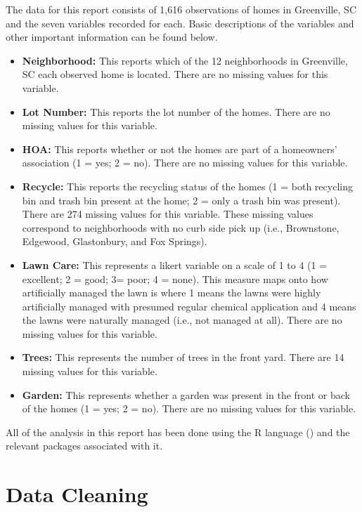 \documentclass{article}
\begin{document}
The data for this report consists of 1,616 observations of homes in Greenville, SC and the seven variables recorded for each. 
Basic descriptions of the variables and other important information can be found below.
\begin{itemize}
\item \textbf{Neighborhood:} This reports which of the 12 neighborhoods in Greenville, SC each observed home is located. There are no missing values for this variable. 
\item \textbf{Lot Number:} This reports the lot number of the homes. There are no missing values for this variable. 
\item \textbf{HOA:} This reports whether or not the homes are part of a homeowners' association (1 = yes; 2 = no). There are no missing values for this variable.
\item \textbf{Recycle:} This reports the recycling status of the homes (1 = both recycling bin and trash bin present at the home; 2 = only a trash bin was present). There are 274 missing values for this variable. These missing values correspond to neighborhoods with no curb side pick up (i.e., Brownstone, Edgewood, Glastonbury, and Fox Springs).
\item \textbf{Lawn Care:} This represents a likert variable on a scale of 1 to 4 (1 = excellent; 2 = good; 3= poor; 4 = none). This measure
maps onto how artificially managed the lawn is where 1 means the lawns were highly artificially managed with presumed regular chemical application and 4 means the lawns were naturally managed (i.e., not managed at all). There are no missing values for this variable.
\item \textbf{Trees:} This represents the number of trees in the front yard. There are 14 missing values for this variable. 
\item \textbf{Garden:} This represents whether a garden was present in the front or back of the homes (1 = yes; 2 = no). There are no missing values for this variable.
\end{itemize}


All of the analysis in this report has been done using the R language (\cite{rstandard}) and the relevant packages associated with it. 

\section*{Data Cleaning}
\end{document}
